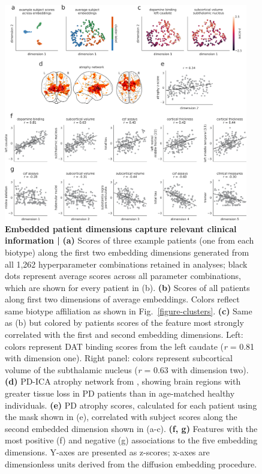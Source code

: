 \documentclass[12pt,aps,pra,reprint,showkeys]{revtex4-1}
\begin{document}
\begin{figure}[htp]
  \begin{center}
    \centerline{\includegraphics[width=0.95\textwidth]{diffusion_embedding.pdf}}
    \caption{
      \textbf{Embedded patient dimensions capture relevant clinical information |}
      \textbf{(a)} Scores of three example patients (one from each biotype) along the first two embedding dimensions generated from all 1,262 hyperparameter combinations retained in analyses; black dots represent average scores across all parameter combinations, which are shown for every patient in (b).
      \textbf{(b)} Scores of all patients along first two dimensions of average embeddings.
      Colors reflect same biotype affiliation as shown in Fig.~\ref{figure-clusters}.
      \textbf{(c)} Same as (b) but colored by patients scores of the feature most strongly correlated with the first and second embedding dimensions.
      Left: colors represent DAT binding scores from the left caudate (\emph{r} = 0.81 with dimension one).
      Right panel: colors represent subcortical volume of the subthalamic nucleus (\emph{r} = 0.63 with dimension two).
      \textbf{(d)} PD-ICA atrophy network from \citep{zeighami2015network}, showing brain regions with greater tissue loss in PD patients than in age-matched healthy individuals.
      \textbf{(e)} PD atrophy scores, calculated for each patient using the mask shown in (e), correlated with subject scores along the second embedded dimension shown in (a-c).
      \textbf{(f, g)} Features with the most positive (f) and negative (g) associations to the five embedding dimensions.
      Y-axes are presented as z-scores; x-axes are dimensionless units derived from the diffusion embedding procedure.
    }
    \label{figure-diffusion}
  \end{center}
\end{figure}
\end{document}
